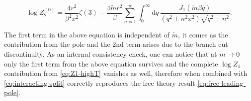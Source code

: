 \documentclass[a4paper,11pt]{article}
\newcommand{\dd}{\mathrm d}
\begin{document}
	


\begin{equation}
 \log Z_2^{(0)}
 =\frac{4r^2}{\beta^2x^2}\zeta(3)
 -\frac{4\tilde m r^2}{\beta}\sum_{n=1}^{\infty}\int_0^{\infty}\dd q\,
 \frac{J_1(\tilde m\beta q)}{(q^2+n^2x^2)\sqrt{q^2+n^2}}.
 \label{eq:contour-rotated}
\end{equation}


The first term in the above equation is independent of $\tilde m$, it comes as the contribution from the pole and the 2nd term arises due to the branch cut discontinuity.
As an internal consistency check, one can notice that at $\tilde m\to0$ only the first term from the above equation survives and the complete $\log Z_1$ contribution from \eqref{eq:Z1-highT} vanishes as well, therefore when combined with \eqref{eq:interacting-split} correctly reproduces the free theory result \eqref{eq:free-leading-pole}.\\

\end{document}
